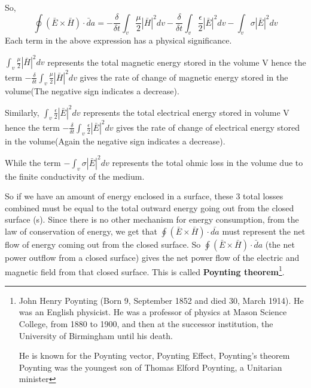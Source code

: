 So,
\begin{dmath}
\oint(\bar{E}\times\bar{H})\cdot\bar{d}a = -  \frac{\delta}{\delta t}\int_{v} \frac{\mu}{2}|\bar{H}|^{2}dv -  \frac{\delta}{\delta t}\int_{v}\frac{\epsilon}{2}|\bar{E}|^{2}dv
- \int_{v}\sigma|\bar{E}|^{2}dv 
\end{dmath}
Each term in the above expression has a physical significance.

$\int_{v} \frac{\mu}{2}|\bar{H}|^{2}dv$ represents the total magnetic energy stored in the volume V hence the term $-\frac{\delta}{\delta t}\int_{v} \frac{\mu}{2}|\bar{H}|^{2}dv$ gives the rate of change of magnetic energy stored in the volume(The negative sign indicates a decrease).

Similarly, $\int_{v}\frac{\epsilon}{2}|\bar{E}|^{2}dv$ represents the total electrical energy stored in volume V hence the term $-\frac{\delta}{\delta t}\int_{v}\frac{\epsilon}{2}|\bar{E}|^{2}dv$ gives the rate of change of electrical energy stored in the volume(Again the negative sign indicates a decrease).

While the term $-\int_{v}\sigma|\bar{E}|^{2}dv $ represents the total ohmic loss in the volume due to the finite conductivity of the medium.

So if we have an amount of energy enclosed in a surface, these 3 total losses combined must be equal to the total outward energy going out from the closed surface (s). Since there is no other mechanism for energy consumption, from the law of conservation of energy, we get that $ \oint(\bar{E}\times\bar{H})\cdot\bar{da} $ must represent the net flow of energy coming out from the closed surface. So $ \oint(\bar{E}\times\bar{H})\cdot\bar{d}a $ (the net power outflow from a closed surface)  gives the net power flow of the electric and magnetic field from that closed surface. This is called \textbf{Poynting theorem}\footnote{
John Henry Poynting (Born 9, September 1852 and died 30, March 1914). He was an English physicist. He was a professor of physics at Mason Science College, from 1880 to 1900, and then at the successor institution, the University of Birmingham until his death.

He is known for the Poynting vector, Poynting Effect, Poynting's theorem 
Poynting was the youngest son of Thomas Elford Poynting, a Unitarian minister
}. 

